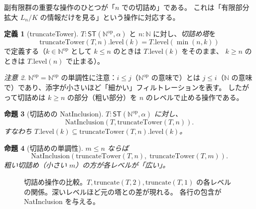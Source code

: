 \documentclass[a4paper,11pt]{ltjsarticle}
\theoremstyle{definition}
\newtheorem{definition}{定義}[section]
\theoremstyle{plain}
\newtheorem{proposition}[definition]{命題}
\theoremstyle{remark}
\newtheorem{remark}[definition]{注意}
\newcommand{\ST}{\mathsf{ST}}
\newcommand{\Nat}{\mathbb{N}}
\newcommand{\Nod}{\mathbb{N}^{\mathrm{op}}}
\begin{document}
副有限群の重要な操作のひとつが「$n$ での切詰め」である。
これは「有限部分拡大 $L_n/K$ の情報だけを見る」という操作に対応する。

\begin{definition}[truncateTower]
\label{def:truncate}
$T : \ST(\Nod, \alpha)$ と $n : \Nat$ に対し、\emph{切詰め塔}を
\[
  \mathrm{truncateTower}(T, n).\mathrm{level}(k) = T.\mathrm{level}(\min(n, k))
\]
で定義する（$k \in \Nod$ として $k \leq n$ のときは $T.\mathrm{level}(k)$ をそのまま、
$k \geq n$ のときは $T.\mathrm{level}(n)$ で止まる）。
\end{definition}

\begin{remark}
$\Nod = \Nat^{\mathrm{op}}$ の単調性に注意：$i \leq j$（$\Nod$ の意味で）とは
$j \leq i$（$\Nat$ の意味で）であり、添字が小さいほど「細かい」フィルトレーションを表す。
したがって切詰めは $k \geq n$ の部分（粗い部分）を $n$ のレベルで止める操作である。
\end{remark}

\begin{proposition}[切詰めの NatInclusion]
$T : \ST(\Nod, \alpha)$ に対し、
\[
  \mathrm{NatInclusion}(T, \mathrm{truncateTower}(T, n)).
\]
すなわち $T.\mathrm{level}(k) \subseteq \mathrm{truncateTower}(T, n).\mathrm{level}(k)$。
\end{proposition}

\begin{proposition}[切詰めの単調性]
$m \leq n$ ならば
\[
  \mathrm{NatInclusion}(\mathrm{truncateTower}(T, n),\; \mathrm{truncateTower}(T, m)).
\]
粗い切詰め（小さい $m$）の方が各レベルが「広い」。
\end{proposition}

\begin{figure}[H]
\centering
{}
\caption{切詰め操作の比較。$T, \mathrm{truncate}(T,2), \mathrm{truncate}(T,1)$
の各レベルの関係。深いレベルほど元の塔との差が現れる。
各行の包含が NatInclusion を与える。}
\label{fig:truncate}
\end{figure}
\end{document}
